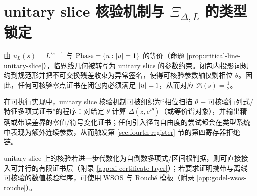\section{unitary slice 核验机制与 \texorpdfstring{$\Xi_{\Delta,L}$}{Xi\_Delta\_L} 的类型锁定}\label{app:unitary-slice}

由 $u_L(s)=L^{2s-1}$ 与 $\mathrm{Phase}=\{u:\left\lvert u\right\rvert=1\}$ 的等价（命题 \ref{prop:critical-line-unitary-slice}），临界线几何被转写为 unitary slice 的参数约束。闭包内投影词规约到规范形并把不可交换残差收束为异常签名，使得可核验参数轴仅剩相位 $\theta$。因此，任何可核验零点证书在闭包内必须满足 $\left\lvert u\right\rvert=1$，从而对应 $\Re(s)=\tfrac12$。

在可执行实现中，unitary slice 核验机制可被组织为“相位扫描 $\theta$ + 可核验行列式/特征多项式证书”的程序：对给定 $\theta$ 计算 $\Delta(z,e^{i\theta})$（或等价谱对象），并输出精确或带误差界的零值/符号变化证书；任何引入径向自由度的尝试都会在类型系统中表现为额外连续参数，从而触发第 \ref{sec:fourth-register} 节的第四寄存器拒绝链。

unitary slice 上的核验若进一步代数化为自倒数多项式/区间根判据，则可直接接入可并行的有限证书层（附录 \ref{app:xi-certificate-layer}）；若要求证明携带与离线可核验的数值核验程序，可使用 WSOS 与 Rouché 模板（附录 \ref{app:godel-wsos-rouche}）。

